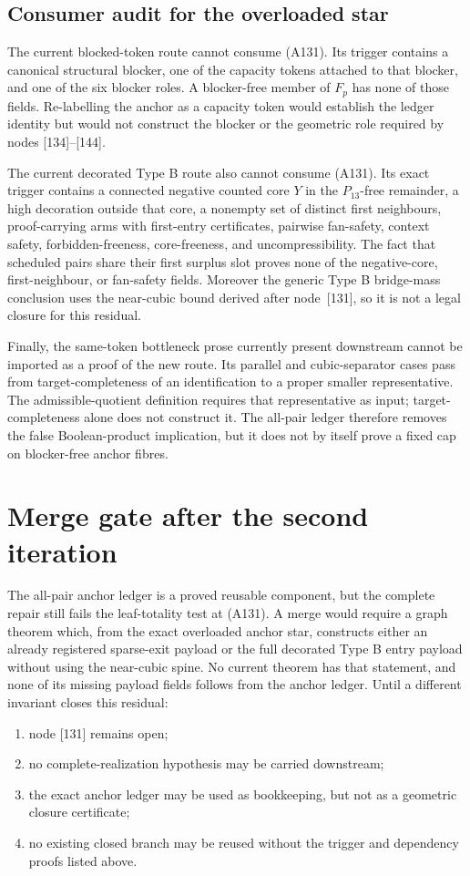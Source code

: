 \documentclass[11pt]{article}
\begin{document}
\subsection*{Consumer audit for the overloaded star}

The current blocked-token route cannot consume (A131).  Its trigger contains
a canonical structural blocker, one of the capacity tokens attached to that
blocker, and one of the six blocker roles.  A blocker-free member of
\(F_p\) has none of those fields.  Re-labelling the anchor as a capacity token
would establish the ledger identity but would not construct the blocker or
the geometric role required by nodes [134]--[144].

The current decorated Type B route also cannot consume (A131).  Its exact
trigger contains a connected negative counted core \(Y\) in the
\(P_{13}\)-free remainder, a high decoration outside that core, a nonempty
set of distinct first neighbours, proof-carrying arms with first-entry
certificates, pairwise fan-safety, context safety, forbidden-freeness,
core-freeness, and uncompressibility.  The fact that scheduled pairs share
their first surplus slot proves none of the negative-core, first-neighbour,
or fan-safety fields.  Moreover the generic Type B bridge-mass conclusion
uses the near-cubic bound derived after node~[131], so it is not a legal
closure for this residual.

Finally, the same-token bottleneck prose currently present downstream cannot
be imported as a proof of the new route.  Its parallel and cubic-separator
cases pass from target-completeness of an identification to a proper smaller
representative.  The admissible-quotient definition requires that
representative as input; target-completeness alone does not construct it.
The all-pair ledger therefore removes the false Boolean-product implication,
but it does not by itself prove a fixed cap on blocker-free anchor fibres.

\section{Merge gate after the second iteration}

The all-pair anchor ledger is a proved reusable component, but the complete
repair still fails the leaf-totality test at (A131).  A merge would require a
graph theorem which, from the exact overloaded anchor star, constructs either
an already registered sparse-exit payload or the full decorated Type B entry
payload without using the near-cubic spine.  No current theorem has that
statement, and none of its missing payload fields follows from the anchor
ledger.  Until a different invariant closes this residual:
\begin{enumerate}
\item node [131] remains open;
\item no complete-realization hypothesis may be carried downstream;
\item the exact anchor ledger may be used as bookkeeping, but not as a
geometric closure certificate;
\item no existing closed branch may be reused without the trigger and
dependency proofs listed above.
\end{enumerate}
\end{document}

